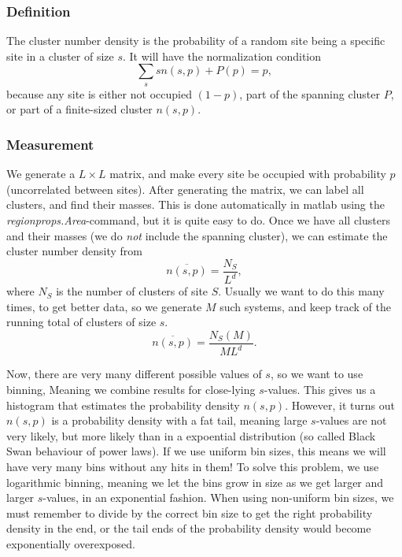 \documentclass[a4paper, 11pt, notitlepage, english]{article}
\begin{document}
\subsubsection*{Definition}

The cluster number density is the probability of a random site being a specific site in a cluster of size $s$. It will have the normalization condition
$$\sum_s sn(s,p) + P(p) = p,$$
because any site is either not occupied $(1-p)$, part of the spanning cluster $P$, or part of a finite-sized cluster $n(s,p)$.

\subsubsection*{Measurement}

We generate a $L\times L$ matrix, and make every site be occupied with probability $p$ (uncorrelated between sites). After generating the matrix, we can label all clusters, and find their masses. This is done automatically in matlab using the \emph{regionprops.Area}-command, but it is quite easy to do. Once we have all clusters and their masses (we do \emph{not} include the spanning cluster), we can estimate the cluster number density from 
$$\overline{n(s,p)} = \frac{N_S}{L^{d}},$$
where $N_S$ is the number of clusters of site $S$. Usually we want to do this many times, to get better data, so we generate $M$ such systems, and keep track of the
 running total of clusters of size $s$.
$$\overline{n(s,p)} = \frac{N_S(M)}{ML^{d}}.$$

Now, there are very many different possible values of $s$, so we want to use binning, Meaning we combine results for close-lying $s$-values. This gives us a histogram that estimates the probability density $n(s,p)$. However, it turns out $n(s,p)$ is a probability density with a fat tail, meaning large $s$-values are not very likely, but more likely than in a expoential distribution (so called Black Swan behaviour of power laws). If we use uniform bin sizes, this means we will have very many bins without any hits in them! To solve this problem, we use logarithmic binning, meaning we let the bins grow in size as we get larger and larger $s$-values, in an exponential fashion. When using non-uniform bin sizes, we must remember to divide by the correct bin size to get the right probability density in the end, or the tail ends of the probability density would become exponentially overexposed.
\end{document}
